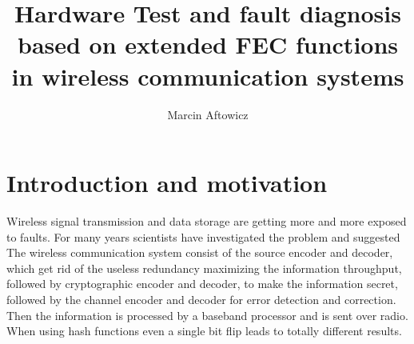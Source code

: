 \documentclass[]{myclass}
\author{Marcin Aftowicz}
\title{Hardware Test and fault diagnosis based on extended FEC functions  in wireless communication systems}
\begin{document}


\frontmatter
\pagestyle{empty}%
\maketitle  \cleardoublepage

   \cleardoublepage

\pagestyle{ppfcmthesis}
    \cleardoublepage

\listoffigures  \cleardoublepage
\listoftables   \cleardoublepage

\tableofcontents \cleardoublepage

\mainmatter
 


\chapter{Introduction and motivation} \label{ch:introduction}
Wireless signal transmission and data storage are getting more and more exposed to faults. For many years scientists have investigated the problem and suggested 
The wireless communication system consist of the source encoder and decoder, which get rid of the useless redundancy maximizing the information throughput, followed by cryptographic encoder and decoder, to make the information secret, followed by the channel encoder and decoder for error detection and correction. Then the information is processed by a baseband processor and is sent over radio. 
When using hash functions even a single bit flip leads to totally different results.
\end{document}

